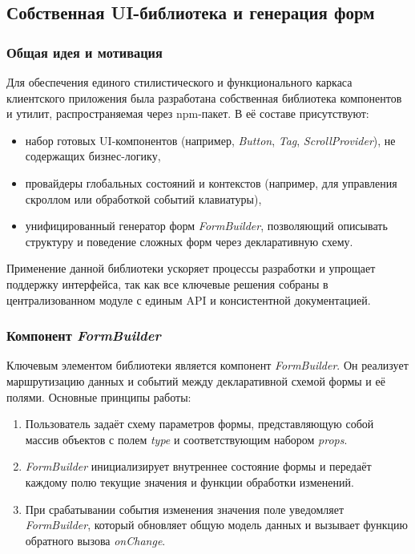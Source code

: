 \subsection{Собственная UI-библиотека и генерация форм}

\subsubsection{Общая идея и мотивация}
Для обеспечения единого стилистического и функционального каркаса клиентского приложения была разработана собственная библиотека компонентов и утилит, распространяемая через npm-пакет. В её составе присутствуют:
\begin{itemize}
  \item набор готовых UI-компонентов (например, \textit{Button}, \textit{Tag}, \textit{ScrollProvider}), не содержащих бизнес-логику,
  \item провайдеры глобальных состояний и контекстов (например, для управления скроллом или обработкой событий клавиатуры),
  \item унифицированный генератор форм \textit{FormBuilder}, позволяющий описывать структуру и поведение сложных форм через декларативную схему.
\end{itemize}
Применение данной библиотеки ускоряет процессы разработки и упрощает поддержку интерфейса, так как все ключевые решения собраны в централизованном модуле с единым API и консистентной документацией.

\subsubsection{Компонент \textit{FormBuilder}}
Ключевым элементом библиотеки является компонент \textit{FormBuilder}. Он реализует маршрутизацию данных и событий между декларативной схемой формы и её полями. Основные принципы работы:
\begin{enumerate}
  \item Пользователь задаёт схему параметров формы, представляющую собой массив объектов с полем \textit{type} и соответствующим набором \textit{props}.
  \item \textit{FormBuilder} инициализирует внутреннее состояние формы и передаёт каждому полю текущие значения и функции обработки изменений.
  \item При срабатывании события изменения значения поле уведомляет \textit{FormBuilder}, который обновляет общую модель данных и вызывает функцию обратного вызова \textit{onChange}.
\end{enumerate}

